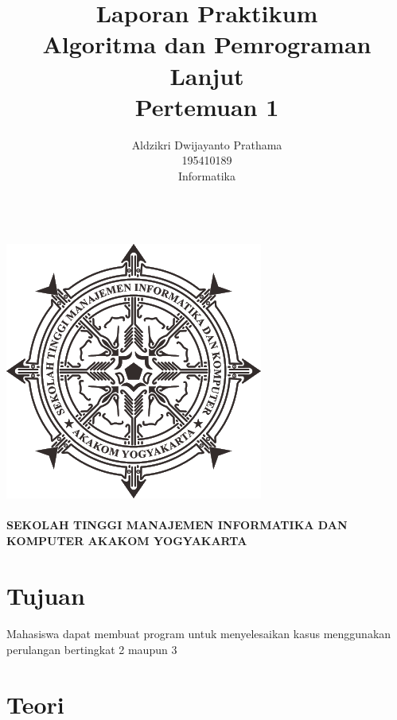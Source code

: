 \documentclass[a4paper,12pt]{article}
\begin{document}
\title{ {\Large Laporan Praktikum}\\ Algoritma dan Pemrograman Lanjut\\{\Large Pertemuan 1}}

\author{Aldzikri Dwijayanto Prathama 
	\\195410189
	\\Informatika}
\makeatletter
\begin{titlepage}
	\begin{center}
		{\huge \bfseries \@title }\\[14ex]
		\includegraphics[scale=.8]{logo}\\[4ex]
		{\large \@author}\\[12ex]
		{\large \bfseries {SEKOLAH TINGGI MANAJEMEN INFORMATIKA DAN KOMPUTER
				AKAKOM YOGYAKARTA}}
	\end{center}


\end{titlepage}
\makeatother
\newpage
\tableofcontents
\newpage

\section{Tujuan}
\paragraph{}
Mahasiswa dapat membuat program untuk menyelesaikan kasus menggunakan
perulangan bertingkat 2 maupun 3

\section{Teori}
\end{document}
